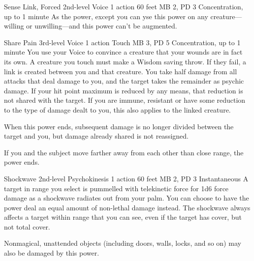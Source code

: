 \DndPowerHeader%
  {Sense Link, Forced}
  {2nd-level Voice}
  {1 action}
  {60 feet}
  {MB 2, PD 3}
  {Concentration, up to 1 minute}
As the  power,
except you can yse this power on any creature---willing or
unwilling---and this power can't be augmented.

\DndPowerHeader%
  {Share Pain}
  {3rd-level Voice}
  {1 action}
  {Touch}
  {MB 3, PD 5}
  {Concentration, up to 1 minute}
  You use your Voice to convince a creature that your wounds are
  in fact its own.
  A creature you touch must make a Wisdom saving throw.
  If they fail, a link is created between you and that creature.
  You take half damage from all attacks that deal damage to you,
  and the target takes the remainder as psychic damage.
  If your hit point maximum is reduced by any means,
  that reduction is not shared with the target.
  If you are immune, resistant or have some reduction
  to the type of damage dealt to you,
  this also applies to the linked creature. 
  
  When this power ends,
  subsequent damage is no longer divided between the target and you,
  but damage already shared is not reassigned.

  If you and the subject move farther away from each other
  than close range, the power ends.

\DndPowerHeader%
  {Shockwave}
  {2nd-level Psychokinesis}
  {1 action}
  {60 feet}
  {MB 2, PD 3}
  {Instantaneous}
A target in range you select is pummelled with telekinetic force
for 1d6 force damage as a shockwave radiates out from your palm.
You can choose to have the power deal an equal amount of
non-lethal damage instead.
The shockwave always affects a target within range that you can see,
even if the target has cover, but not total cover.

Nonmagical, unattended objects
(including doors, walls, locks, and so on)
may also be damaged by this power.

